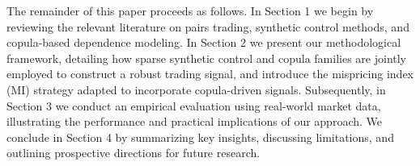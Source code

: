 The remainder of this paper proceeds as follows. 
%
In Section 1 %
we begin by reviewing the relevant literature on pairs trading, synthetic control methods, and copula-based dependence modeling. 
%
In Section 2 %
we present our methodological framework, detailing how sparse synthetic control and copula families are jointly employed to construct a robust trading signal, and introduce the mispricing index (MI) strategy adapted to incorporate copula-driven signals. 
%
Subsequently, in Section 3 %
we conduct an empirical evaluation using real-world market data, illustrating the performance and practical implications of our approach. 
%
We conclude in Section 4 %
by summarizing key insights, discussing limitations, and outlining prospective directions for future research.
